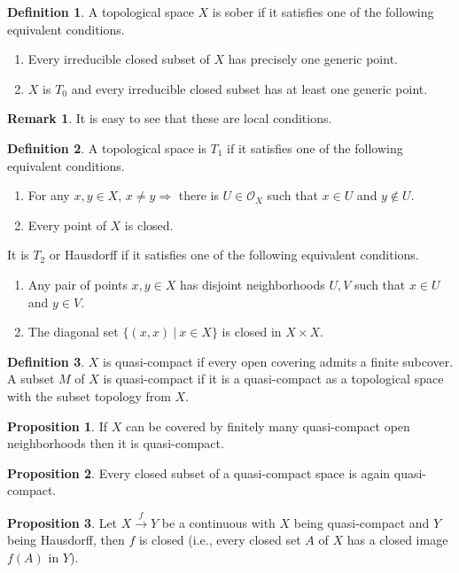 \documentclass[10pt]{article}
\numberwithin{equation}{section}
\theoremstyle{definition}
\newtheorem{proposition}{Proposition}[subsection]
\newtheorem{definition}{Definition}[subsection]
\newtheorem{remark}{Remark}[subsection]
\newcommand{\Ouv}{\mathscr{O}}
\newcommand{\sep}[0]{\:|\:}
\begin{document}
\begin{definition}
    \label{definition_2}
    A topological space $X$ is sober if it satisfies one of the following equivalent conditions.
    \begin{enumerate}[1.]
        \item Every irreducible closed subset of $X$ has precisely one generic point.
        \item $X$ is $T_0$ and every irreducible closed subset has at least one generic point.
    \end{enumerate}
\end{definition}
\begin{remark}
    It is easy to see that these are local conditions.
\end{remark}
\begin{definition}
    A topological space is $T_1$ if it satisfies one of the following equivalent conditions.
    \begin{enumerate}[1.]
        \item For any $x,y\in X$, $x\not=y\Rightarrow $ there is $U\in\Ouv_X$ such that $x\in U$ and $y\not\in U$.
        \item Every point of $X$ is closed.
    \end{enumerate}
    It is $T_2$ or Hausdorff if it satisfies one of the following equivalent conditions.
    \begin{enumerate}[1.]
        \item Any pair of points $x,y\in X$ has disjoint neighborhoods $U,V$ such that $x\in U$ and $y\in V$.
        \item The diagonal set $\{(x,x)\sep x\in X\}$ is closed in $X\times X$.
    \end{enumerate}
\end{definition}
\begin{definition}
    $X$ is quasi-compact if every open covering admits a finite subcover. A subset $M$ of $X$ is quasi-compact if it is a quasi-compact as a topological space with the subset topology from $X$.
\end{definition}
\begin{proposition}
    If $X$ can be covered by finitely many quasi-compact open neighborhoods then it is quasi-compact.
\end{proposition}
\begin{proposition}
    Every closed subset of a quasi-compact space is again quasi-compact.
\end{proposition}
\begin{proposition}
    \label{fact_3}
    Let $X\stackrel{f}{\to}Y$ be a continuous with $X$ being quasi-compact and $Y$ being Hausdorff, then $f$ is closed (i.e., every closed set $A$ of $X$ has a closed image $f(A)$ in $Y$).
\end{proposition}
\end{document}
